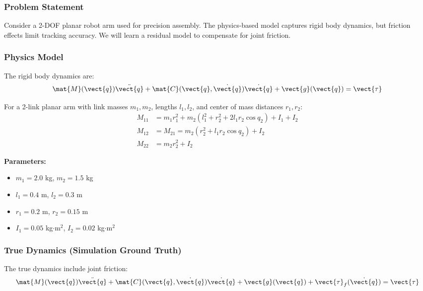 \subsubsection{Problem Statement}

Consider a 2-DOF planar robot arm used for precision assembly. The physics-based model captures rigid body dynamics, but friction effects limit tracking accuracy. We will learn a residual model to compensate for joint friction.

\subsubsection{Physics Model}

The rigid body dynamics are:
\begin{equation}
\mat{M}(\vect{q})\ddot{\vect{q}} + \mat{C}(\vect{q}, \dot{\vect{q}})\dot{\vect{q}} + \vect{g}(\vect{q}) = \vect{\tau}
\end{equation}

For a 2-link planar arm with link masses $m_1, m_2$, lengths $l_1, l_2$, and center of mass distances $r_1, r_2$:
\begin{align}
M_{11} &= m_1 r_1^2 + m_2(l_1^2 + r_2^2 + 2l_1 r_2 \cos q_2) + I_1 + I_2 \\
M_{12} &= M_{21} = m_2(r_2^2 + l_1 r_2 \cos q_2) + I_2 \\
M_{22} &= m_2 r_2^2 + I_2
\end{align}

\textbf{Parameters:}
\begin{itemize}
    \item $m_1 = 2.0$ kg, $m_2 = 1.5$ kg
    \item $l_1 = 0.4$ m, $l_2 = 0.3$ m
    \item $r_1 = 0.2$ m, $r_2 = 0.15$ m
    \item $I_1 = 0.05$ kg$\cdot$m$^2$, $I_2 = 0.02$ kg$\cdot$m$^2$
\end{itemize}

\subsubsection{True Dynamics (Simulation Ground Truth)}

The true dynamics include joint friction:
\begin{equation}
\mat{M}(\vect{q})\ddot{\vect{q}} + \mat{C}(\vect{q}, \dot{\vect{q}})\dot{\vect{q}} + \vect{g}(\vect{q}) + \vect{\tau}_f(\dot{\vect{q}}) = \vect{\tau}
\end{equation}

